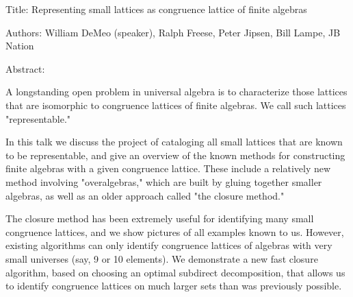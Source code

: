 Title: Representing small lattices as congruence lattice of finite algebras

Authors: William DeMeo (speaker), Ralph Freese, Peter Jipsen, Bill Lampe, JB Nation

Abstract: 

A longstanding open problem in universal algebra is to characterize those
lattices that are isomorphic to congruence lattices of finite algebras.  
We call such lattices "representable."

In this talk we discuss the project of cataloging all small lattices that are
known to be representable, and give an overview of the known methods for
constructing finite algebras with a given congruence lattice.  These include a
relatively new method involving "overalgebras," which are built by gluing
together smaller algebras, as well as an older approach called "the closure
method."

The closure method has been extremely useful for identifying many small
congruence lattices, and we show pictures of all examples known to us. However,
existing algorithms can only identify congruence lattices of algebras with very
small universes (say, 9 or 10 elements). We demonstrate a new fast closure
algorithm, based on choosing an optimal subdirect decomposition, that allows us
to identify congruence lattices on much larger sets than was previously
possible.  

